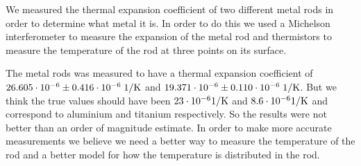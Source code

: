 We measured the thermal expansion coefficient of two different metal rods in order to determine what metal it is.
In order to do this we used a Michelson interferometer to measure the expansion of the metal rod and thermistors to measure the temperature of the rod at three points on its surface.

The metal rods was measured to have a thermal expansion coefficient of $26.605 \cdot 10^{-6} \pm 0.416 \cdot 10^{-6} \; \rm{1/K}$ and $19.371 \cdot 10^{-6} \pm 0.110 \cdot 10^{-6} \; \rm{1/K}$.
But we think the true values should have been $23\cdot10^{-6} \rm{1/K}$ and $8.6\cdot10^{-6} \rm{1/K}$
and correspond to aluminium and titanium respectively. So the results were not better than an order of magnitude estimate.
In order to make more accurate measurements we believe we need a better way to measure the temperature of the rod and a better model for how the temperature is distributed in the rod.

